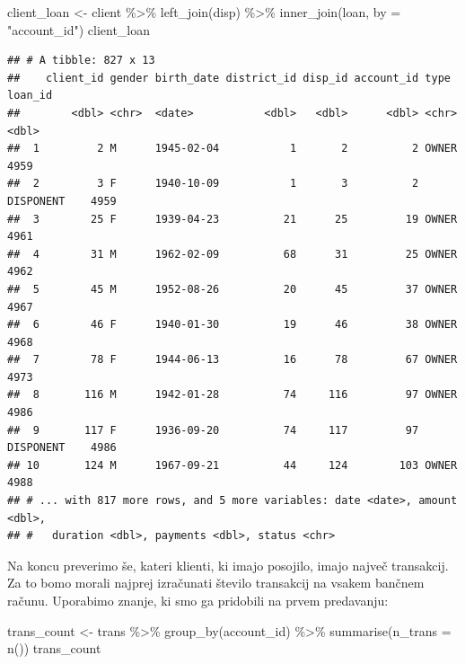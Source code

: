\documentclass[
]{book}
\newenvironment{Shaded}{\begin{snugshade}}{\end{snugshade}}
\newcommand{\AttributeTok}[1]{\textcolor[rgb]{0.77,0.63,0.00}{#1}}
\newcommand{\FunctionTok}[1]{\textcolor[rgb]{0.00,0.00,0.00}{#1}}
\newcommand{\NormalTok}[1]{#1}
\newcommand{\OtherTok}[1]{\textcolor[rgb]{0.56,0.35,0.01}{#1}}
\newcommand{\SpecialCharTok}[1]{\textcolor[rgb]{0.00,0.00,0.00}{#1}}
\newcommand{\StringTok}[1]{\textcolor[rgb]{0.31,0.60,0.02}{#1}}
\begin{document}
\begin{Shaded}
\begin{Highlighting}[]
\NormalTok{client\_loan }\OtherTok{\textless{}{-}}\NormalTok{ client }\SpecialCharTok{\%\textgreater{}\%}
  \FunctionTok{left\_join}\NormalTok{(disp) }\SpecialCharTok{\%\textgreater{}\%}
  \FunctionTok{inner\_join}\NormalTok{(loan, }\AttributeTok{by =} \StringTok{"account\_id"}\NormalTok{)}
\NormalTok{client\_loan}
\end{Highlighting}
\end{Shaded}

\begin{verbatim}
## # A tibble: 827 x 13
##    client_id gender birth_date district_id disp_id account_id type      loan_id
##        <dbl> <chr>  <date>           <dbl>   <dbl>      <dbl> <chr>       <dbl>
##  1         2 M      1945-02-04           1       2          2 OWNER        4959
##  2         3 F      1940-10-09           1       3          2 DISPONENT    4959
##  3        25 F      1939-04-23          21      25         19 OWNER        4961
##  4        31 M      1962-02-09          68      31         25 OWNER        4962
##  5        45 M      1952-08-26          20      45         37 OWNER        4967
##  6        46 F      1940-01-30          19      46         38 OWNER        4968
##  7        78 F      1944-06-13          16      78         67 OWNER        4973
##  8       116 M      1942-01-28          74     116         97 OWNER        4986
##  9       117 F      1936-09-20          74     117         97 DISPONENT    4986
## 10       124 M      1967-09-21          44     124        103 OWNER        4988
## # ... with 817 more rows, and 5 more variables: date <date>, amount <dbl>,
## #   duration <dbl>, payments <dbl>, status <chr>
\end{verbatim}

Na koncu preverimo še, kateri klienti, ki imajo posojilo, imajo največ transakcij. Za to bomo morali najprej izračunati število transakcij na vsakem bančnem računu. Uporabimo znanje, ki smo ga pridobili na prvem predavanju:

\begin{Shaded}
\begin{Highlighting}[]
\NormalTok{trans\_count }\OtherTok{\textless{}{-}}\NormalTok{ trans }\SpecialCharTok{\%\textgreater{}\%}
  \FunctionTok{group\_by}\NormalTok{(account\_id) }\SpecialCharTok{\%\textgreater{}\%}
  \FunctionTok{summarise}\NormalTok{(}\AttributeTok{n\_trans =} \FunctionTok{n}\NormalTok{())}
\NormalTok{trans\_count}
\end{Highlighting}
\end{Shaded}
\end{document}
